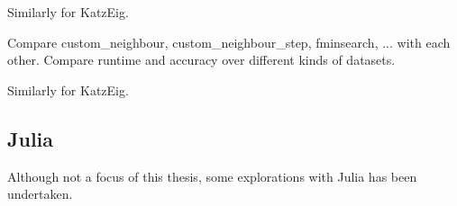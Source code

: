 Similarly for KatzEig.


Compare custom\_neighbour, custom\_neighbour\_step, fminsearch, ... with each other. Compare runtime and accuracy over different kinds of datasets.

Similarly for KatzEig.



\subsection{Julia}\label{subsec:res:julia}


Although not a focus of this thesis, some explorations with Julia has been undertaken.


%
%
%

